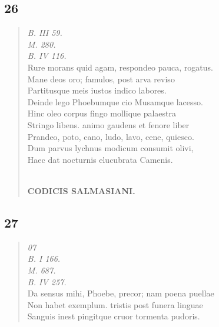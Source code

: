 \documentclass[11pt, a4paper]{report}
\begin{document}
            \subsection*{26}
      \begin{verse}
      \textit{B. III 59.} \\ \textit{M. 280.} \\ \textit{B. IV 116.} \\ Rure morans quid agam, respondeo pauca, rogatus. \\ Mane deos oro; famulos, post arva reviso \\ Partitusque meis iustos indico labores. \\ Deinde lego Phoebumque cio Musamque lacesso. \\ Hinc oleo corpus fingo mollique palaestra \\ Stringo libens. animo gaudens et fenore liber \\ Prandeo, poto, cano, ludo, lavo, cene, quiesco. \\ Dum parvus lychnus modicum consumit olivi, \\ Haec dat nocturnis elucubrata Camenis. \\ 
        ﻿\pagebreak 
    \begin{center} \textbf{CODICIS SALMASIANI.} \end{center} \marginpar{[99]} 
      \end{verse}
  
            \subsection*{27}
      \begin{verse}
      \textit{07} \\ \textit{B. I 166.} \\ \textit{M. 687.} \\ \textit{B. IV 257.} \\ Da sensus mihi, Phoebe, precor; nam poena puellae \\ Non habet exemplum. tristis post funera linguae \\ Sanguis inest pingitque cruor tormenta pudoris. \\ 
      \end{verse}
  
\end{document}
